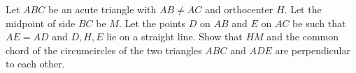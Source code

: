 Let $ABC$ be an acute triangle with $AB \neq AC$ and orthocenter $H$.
Let the midpoint of side $BC$ be $M$. Let the points $D$ on $AB$ and $E$ on $AC$ be
such that $AE = AD$ and $D,H,E$ lie on a straight line. Show that $HM$ and the common
chord of the circumcircles of the two triangles $ABC$ and $ADE$ are perpendicular to each other.